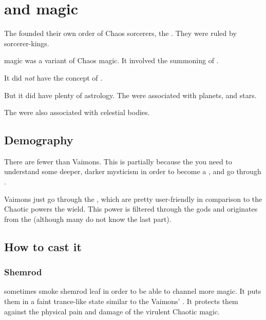 \section{\Rethyaxes and magic}
The \Ortaicans{} founded their own order of Chaos sorcerers, the \rethyaxes. 
They were ruled by \rethyax{} sorcerer-kings. 

\Rethyactic magic was a variant of \Draconic{} Chaos magic. 
It involved the summoning of . 

It did \emph{not} have the concept of . 

But it did have plenty of astrology. 
The \daemons{} were associated with planets,  and stars. 

The  were also associated with celestial bodies. 









\subsection{Demography}
There are fewer \rethyaxes{} than Vaimons. 
This is partially because the you need to understand some deeper, darker mysticism in order to become a \rethyax, and go through . 

Vaimons just go through the \Archons, which are pretty user-friendly in comparison to the Chaotic powers the \rethyaxes{} wield. 
This power is filtered through the \Ortaican{} gods and originates from the \xss{} (although many \rethyaxes{} do not know the last part). 









\subsection{How to cast it}





\subsubsection{Shemrod}
\Rethyaxes{} sometimes smoke shemrod leaf in order to be able to channel more magic. 
It puts them in a faint trance-like state similar to the Vaimons' . 
It protects them against the physical pain and damage of the virulent Chaotic magic. 

